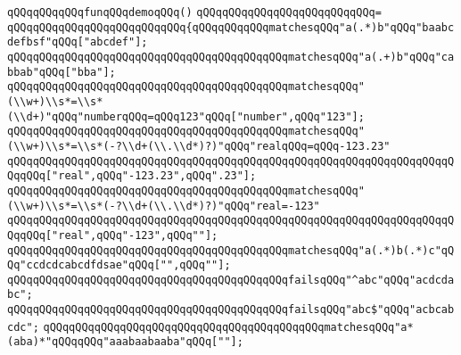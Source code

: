 \verb|qQQqqQQqqQQqfunqQQqdemoqQQq()|\newline
\verb|qQQqqQQqqQQqqQQqqQQqqQQqqQQq=|\newline
\verb|qQQqqQQqqQQqqQQqqQQqqQQqqQQq{qQQqqQQqqQQqmatchesqQQq"a(.*)b"qQQq"baabcdefbsf"qQQq["abcdef"];|\newline
\verb|qQQqqQQqqQQqqQQqqQQqqQQqqQQqqQQqqQQqqQQqqQQqmatchesqQQq"a(.+)b"qQQq"cabbab"qQQq["bba"];|\newline
\verb|qQQqqQQqqQQqqQQqqQQqqQQqqQQqqQQqqQQqqQQqqQQqmatchesqQQq"(\\w+)\\s*=\\s*(\\d+)"qQQq"numberqQQq=qQQq123"qQQq["number",qQQq"123"];|\newline
\newline
\verb|qQQqqQQqqQQqqQQqqQQqqQQqqQQqqQQqqQQqqQQqqQQqmatchesqQQq"(\\w+)\\s*=\\s*(-?\\d+(\\.\\d*)?)"qQQq"realqQQq=qQQq-123.23"|\newline
\verb|qQQqqQQqqQQqqQQqqQQqqQQqqQQqqQQqqQQqqQQqqQQqqQQqqQQqqQQqqQQqqQQqqQQqqQQqqQQq["real",qQQq"-123.23",qQQq".23"];|\newline
\newline
\verb|qQQqqQQqqQQqqQQqqQQqqQQqqQQqqQQqqQQqqQQqqQQqmatchesqQQq"(\\w+)\\s*=\\s*(-?\\d+(\\.\\d*)?)"qQQq"real=-123"|\newline
\verb|qQQqqQQqqQQqqQQqqQQqqQQqqQQqqQQqqQQqqQQqqQQqqQQqqQQqqQQqqQQqqQQqqQQqqQQqqQQq["real",qQQq"-123",qQQq""];|\newline
\newline
\verb|qQQqqQQqqQQqqQQqqQQqqQQqqQQqqQQqqQQqqQQqqQQqmatchesqQQq"a(.*)b(.*)c"qQQq"ccdcdcabcdfdsae"qQQq["",qQQq""];|\newline
\verb|qQQqqQQqqQQqqQQqqQQqqQQqqQQqqQQqqQQqqQQqqQQqfailsqQQq"^abc"qQQq"acdcdabc";|\newline
\verb|qQQqqQQqqQQqqQQqqQQqqQQqqQQqqQQqqQQqqQQqqQQqfailsqQQq"abc$"qQQq"acbcabcdc";|\newline
\verb|qQQqqQQqqQQqqQQqqQQqqQQqqQQqqQQqqQQqqQQqqQQqmatchesqQQq"a*(aba)*"qQQqqQQq"aaabaabaaba"qQQq[""];|\newline
